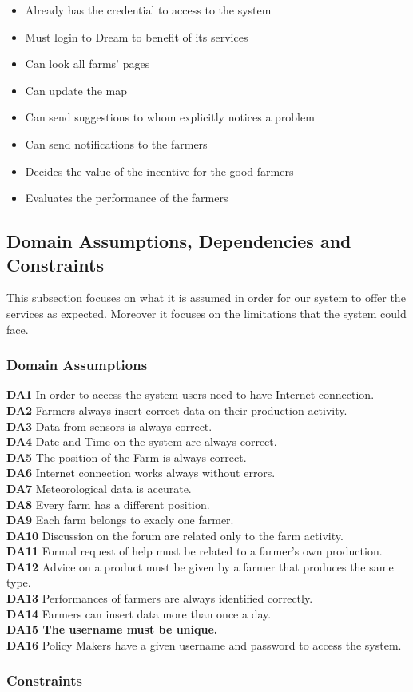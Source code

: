 \begin{itemize}
    \renewcommand\labelitemi{--}
    \item Already has the credential to access to the system
    \item Must login to Dream to benefit of its services
    \item Can look all farms' pages
    \item Can update the map
    \item Can send suggestions to whom explicitly notices a problem
    \item Can send notifications to the farmers
    \item Decides the value of the incentive for the good farmers
    \item Evaluates the performance of the farmers
\end{itemize}


\subsection{Domain Assumptions, Dependencies and Constraints}
This subsection focuses on what it is assumed in order for our system to offer the services as expected.
Moreover it focuses on the limitations that the system could face.

\subsubsection{Domain Assumptions}
\textbf{DA1} In order to access the system users need to have Internet connection.\\
\textbf{DA2} Farmers always insert correct data on their production activity.\\
\textbf{DA3} Data from sensors is always correct.\\
\textbf{DA4} Date and Time on the system are always correct.\\
\textbf{DA5} The position of the Farm is always correct.\\
\textbf{DA6} Internet connection works always without errors.\\
\textbf{DA7} Meteorological data is accurate.\\
\textbf{DA8} Every farm has a different position.\\
\textbf{DA9} Each farm belongs to exacly one farmer.\\
\textbf{DA10} Discussion on the forum are related only to the farm activity.\\
\textbf{DA11} Formal request of help must be related to a farmer's own production.\\
\textbf{DA12} Advice on a product must be given by a farmer that produces the same type.\\
\textbf{DA13} Performances of farmers are always identified correctly.\\
\textbf{DA14} Farmers can insert data more than once a day.\\
\textbf{DA15 The username must be unique.}\\
\textbf{DA16} Policy Makers have a given username and password to access the system.

\subsubsection{Constraints}